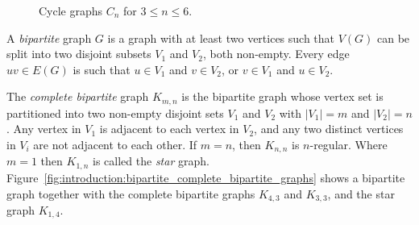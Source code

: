 \begin{figure}[!htbp]
{
}
\quad
\caption{Cycle graphs $C_n$ for $3 \leq n \leq 6$.}
\label{fig:introduction:four_cycle_graphs}
\end{figure}

A \emph{bipartite} graph $G$ is a graph with at least two
vertices such that $V(G)$ can be split into two disjoint subsets $V_1$
and $V_2$, both non-empty. Every edge $uv \in E(G)$ is such that
$u \in V_1$ and $v \in V_2$, or $v \in V_1$ and $u \in V_2$.

The \emph{complete bipartite} graph $K_{m,n}$ is the bipartite graph
whose vertex set is partitioned into two non-empty disjoint sets $V_1$
and $V_2$ with $|V_1| = m$ and $|V_2| = n$. Any vertex in $V_1$ is
adjacent to each vertex in $V_2$, and any two distinct vertices in
$V_i$ are not adjacent to each other. If $m = n$, then $K_{n,n}$ is
$n$-regular. Where $m = 1$ then $K_{1,n}$ is called the \emph{star}
graph. Figure~\ref{fig:introduction:bipartite_complete_bipartite_graphs}
shows a bipartite graph together with the complete bipartite graphs
$K_{4,3}$ and $K_{3,3}$, and the star graph $K_{1,4}$.

